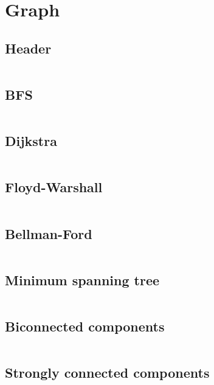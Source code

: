 \section{Graph}
\subsection{Header}
\inputminted[frame=single,framesep=3pt,breaklines=true,tabsize=2,linenos]{c++}{graph/graph.h}

\subsection{BFS}
\inputminted[frame=single,framesep=3pt,breaklines=true,tabsize=2,linenos,label=O(E+V)]{c++}{graph/bfs.cpp}

\subsection{Dijkstra}
\inputminted[frame=single,framesep=3pt,breaklines=true,tabsize=2,linenos,label=O((E+V)log(V))]{c++}{graph/dijkstra.cpp}

\subsection{Floyd-Warshall}
\inputminted[frame=single,framesep=3pt,breaklines=true,tabsize=2,linenos,label=O($V^3$)]{c++}{graph/floyd-warshall.cpp}

\subsection{Bellman-Ford}
\inputminted[frame=single,framesep=3pt,breaklines=true,tabsize=2,linenos,label=O(E V)]{c++}{graph/bellman-ford.cpp}

\subsection{Minimum spanning tree}
\inputminted[frame=single,framesep=3pt,breaklines=true,tabsize=2,linenos,label=O(E log(V))]{c++}{graph/kruskal.cpp}

\subsection{Biconnected components}
\inputminted[frame=single,framesep=3pt,breaklines=true,tabsize=2,linenos,label=O(E+V)]{c++}{graph/biconnected-components.cpp}

\subsection{Strongly connected components}
\inputminted[frame=single,framesep=3pt,breaklines=true,tabsize=2,linenos,label=O(E+V)]{c++}{graph/scc.cpp}

